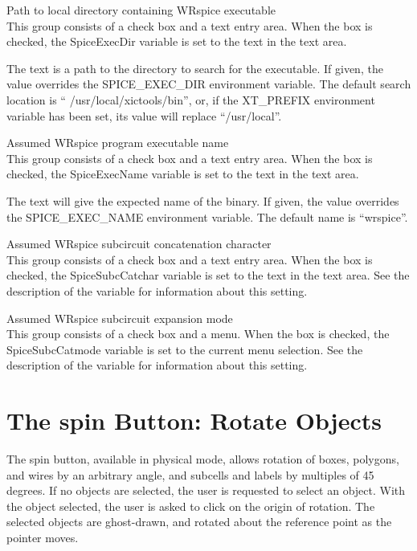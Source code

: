 \begin{description}
\item{\cb Path to local directory containing WRspice executable}\\
This group consists of a check box and a text entry area.  When the
box is checked, the {\et SpiceExecDir} variable is set to the text in
the text area.

The text is a path to the directory to search for the {\WRspice}
executable.  If given, the value overrides the {\et SPICE\_EXEC\_DIR}
environment variable.  The default search location is ``{\vt
/usr/local/xictools/bin}'', or, if the {\et XT\_PREFIX} environment
variable has been set, its value will replace ``{\vt /usr/local}''.

\item{\cb Assumed WRspice program executable name}\\
This group consists of a check box and a text entry area.  When the
box is checked, the {\et SpiceExecName} variable is set to the text in
the text area.

The text will give the expected name of the {\WRspice} binary.  If
given, the value overrides the {\et SPICE\_EXEC\_NAME} environment
variable.  The default name is ``{\vt wrspice}''.

\item{\cb Assumed WRspice subcircuit concatenation character}\\
This group consists of a check box and a text entry area.  When the
box is checked, the {\et SpiceSubcCatchar} variable is set to the text
in the text area.  See the description of the variable for information
about this setting.

\item{\cb Assumed WRspice subcircuit expansion mode}\\
This group consists of a check box and a menu.  When the box is
checked, the {\et SpiceSubcCatmode} variable is set to the current
menu selection.  See the description of the variable for information
about this setting.
\end{description}


\section{The {\cb spin} Button: Rotate Objects}

The {\cb spin} button, available in physical mode, allows rotation of
boxes, polygons, and wires by an arbitrary angle, and subcells and
labels by multiples of 45 degrees.  If no objects are selected, the
user is requested to select an object.  With the object selected, the
user is asked to click on the origin of rotation.  The selected
objects are ghost-drawn, and rotated about the reference point as the
pointer moves.

